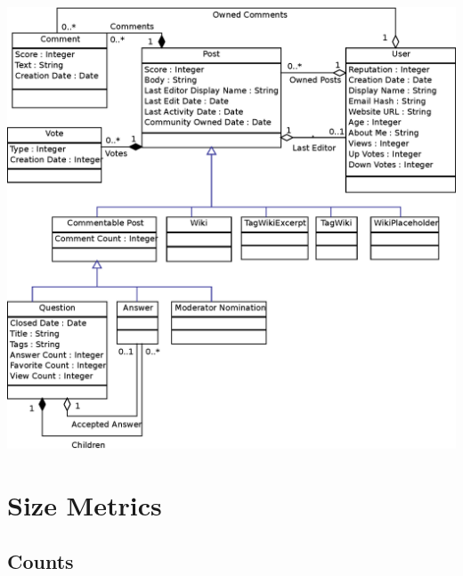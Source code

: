 \documentclass{article}
\begin{document}
\includegraphics[width=\linewidth]{ClassDiagram}

\newpage

\section{Size Metrics}

\subsection{Counts}
\end{document}
